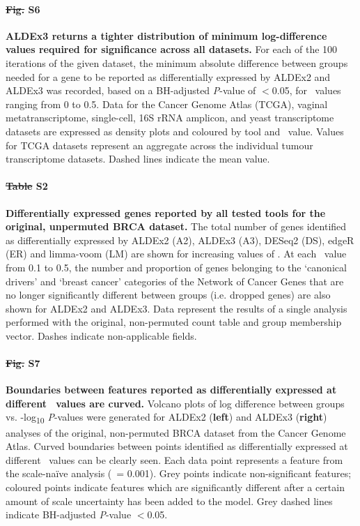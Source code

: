 \documentclass[10pt,letterpaper]{article}
\providecommand{\DIFaddtex}[1]{{\protect\color{blue}\uwave{#1}}} %
\providecommand{\DIFdeltex}[1]{{\protect\color{red}\sout{#1}}}                      %
\providecommand{\DIFaddbegin}{} %
\providecommand{\DIFaddend}{} %
\providecommand{\DIFdelbegin}{} %
\providecommand{\DIFdelend}{} %
\providecommand{\DIFadd}[1]{\texorpdfstring{\DIFaddtex{#1}}{#1}} %
\providecommand{\DIFdel}[1]{\texorpdfstring{\DIFdeltex{#1}}{}} %
\newcommand{\DIFscaledelfig}{0.5}
\newlength{\DIFdelgraphicswidth} %
\newlength{\DIFdelgraphicsheight} %
\newcommand{\DIFaddincludegraphics}[2][]{{\color{blue}\fbox{\DIFOincludegraphics[#1]{#2}}}} %
\newcommand{\DIFdelincludegraphics}[2][]{%
\sbox{\DIFdelgraphicsbox}{\DIFOincludegraphics[#1]{#2}}%
\settoboxwidth{\DIFdelgraphicswidth}{\DIFdelgraphicsbox} %
\settoboxtotalheight{\DIFdelgraphicsheight}{\DIFdelgraphicsbox} %
\scalebox{\DIFscaledelfig}{%
\parbox[b]{\DIFdelgraphicswidth}{\usebox{\DIFdelgraphicsbox}\\[-\baselineskip] \rule{\DIFdelgraphicswidth}{0em}}\llap{\resizebox{\DIFdelgraphicswidth}{\DIFdelgraphicsheight}{%
\setlength{\unitlength}{\DIFdelgraphicswidth}%
\begin{picture}(1,1)%
\thicklines\linethickness{2pt} %
{\color[rgb]{1,0,0}\put(0,0){\framebox(1,1){}}}%
{\color[rgb]{1,0,0}\put(0,0){\line( 1,1){1}}}%
{\color[rgb]{1,0,0}\put(0,1){\line(1,-1){1}}}%
\end{picture}%
}\hspace*{3pt}}} %
} %
\DeclareRobustCommand{\DIFaddbegin}{\DIFOaddbegin \let\includegraphics\DIFaddincludegraphics} %
\DeclareRobustCommand{\DIFaddend}{\DIFOaddend \let\includegraphics\DIFOincludegraphics} %
\DeclareRobustCommand{\DIFdelbegin}{\DIFOdelbegin \let\includegraphics\DIFdelincludegraphics} %
\DeclareRobustCommand{\DIFdelend}{\DIFOaddend \let\includegraphics\DIFOincludegraphics} %
\begin{document}
\paragraph*{\DIFdelbegin \DIFdel{Fig. }\DIFdelend S6 \DIFaddbegin \DIFadd{Fig}\DIFaddend }
\label{fig:supFigDensity}
\textbf{ALDEx3 returns a tighter distribution of minimum log-difference values required for significance across all datasets.} For each of the 100 iterations of the given dataset, the minimum absolute difference between groups needed for a gene to be reported as differentially expressed by ALDEx2 and ALDEx3 was recorded, based on a BH-adjusted \textit{P}-value of $<$0.05, for \textgamma~values ranging from 0 to 0.5. Data for the Cancer Genome Atlas (TCGA), vaginal metatranscriptome, single-cell, 16S rRNA amplicon, and yeast transcriptome datasets are expressed as density plots and coloured by tool and \textgamma~value. Values for TCGA datasets represent an aggregate across the individual tumour transcriptome datasets. Dashed lines indicate the mean value.

\paragraph*{\DIFdelbegin \DIFdel{Table }\DIFdelend S2 \DIFaddbegin \DIFadd{Table}\DIFaddend }
\label{tab:sigGenesReal}
\textbf{Differentially expressed genes reported by all tested tools for the original, unpermuted BRCA dataset.} The total number of genes identified as differentially expressed by ALDEx2 (A2), ALDEx3 (A3), DESeq2 (DS), edgeR (ER) and limma-voom (LM) are shown for increasing values of \textgamma. At each \textgamma~value from 0.1 to 0.5, the number and proportion of genes belonging to the `canonical drivers' and `breast cancer' categories of the Network of Cancer Genes \cite{repana_network_2019} that are no longer significantly different between groups (i.e. dropped genes) are also shown for ALDEx2 and ALDEx3. Data represent the results of a single analysis performed with the original, non-permuted count table and group membership vector. Dashes indicate non-applicable fields. 

\paragraph*{\DIFdelbegin \DIFdel{Fig. }\DIFdelend S7 \DIFaddbegin \DIFadd{Fig}\DIFaddend }
\label{fig:supFigEffectUnperm}
\textbf{Boundaries between features reported as differentially expressed at different \textgamma~values are curved.} Volcano plots of log difference between groups vs. -log\textsubscript{10} \textit{P}-values were generated for ALDEx2 (\textbf{left}) and ALDEx3 (\textbf{right}) analyses of the original, non-permuted BRCA dataset from the Cancer Genome Atlas. Curved boundaries between points identified as differentially expressed at different \textgamma~values can be clearly seen. Each data point represents a feature from the scale-na\"ive analysis (\textgamma~= 0.001). Grey points indicate non-significant features; coloured points indicate features which are significantly different after a certain amount of scale uncertainty has been added to the model. Grey dashed lines indicate BH-adjusted \textit{P}-value $<$0.05.
\end{document}
